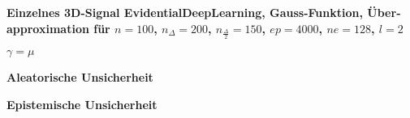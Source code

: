 \begin{otherlanguage}{ngerman}






\begin{samepage}
\begin{minipage}{\textwidth}

\noindent\textbf{Einzelnes 3D-Signal \gls{EvidentialDeepLearning}, Gauss-Funktion,
Überapproximation für $n=100$, $n_{\Delta}=200$, $n_{\frac{\Delta}{2}}=150$, $ep=4000$, $ne=128$, $l=2$}


\begin{minipage}{0.05\textwidth}\vspace{0.5cm}\end{minipage}%
\begin{minipage}{0.3\textwidth}\centering \textbf{$\gamma=\mu$}\end{minipage}%
\begin{minipage}{0.3\textwidth}\centering \textbf{Aleatorische Unsicherheit}\end{minipage}%
\begin{minipage}{0.3\textwidth}\centering \textbf{Epistemische Unsicherheit}\end{minipage}


\end{minipage}
\end{samepage}
\end{otherlanguage}
